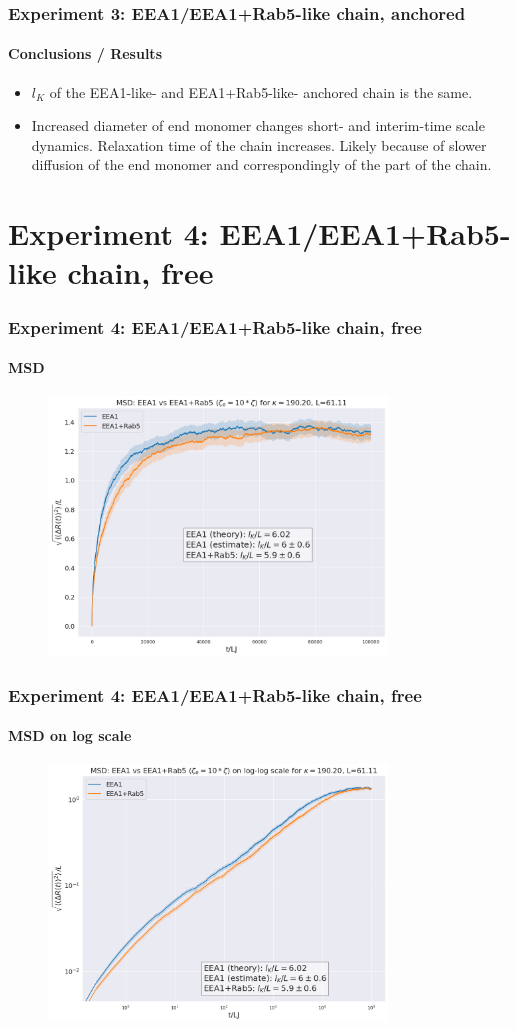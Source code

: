 \documentclass[handout]{beamer}
\begin{document}
\begin{frame}
    \frametitle{Experiment 3: EEA1/EEA1+Rab5-like chain, anchored}
    \framesubtitle{Conclusions / Results}
    \begin{itemize}
        \item $l_K$ of the EEA1-like- and EEA1+Rab5-like- anchored chain is the same.
        \item Increased diameter of end monomer changes short- and interim-time scale 
        dynamics. Relaxation time of the chain increases. Likely because of slower
        diffusion of the end monomer and correspondingly of the part of the chain.
    \end{itemize}
\end{frame}

\section{Experiment 4: EEA1/EEA1+Rab5-like chain, free}

\begin{frame}
    \frametitle{Experiment 4: EEA1/EEA1+Rab5-like chain, free}
    \framesubtitle{MSD}
    \begin{figure}[h]
        \includegraphics[width=9cm]{./17-exp-msd.png}
    \end{figure}
\end{frame}

\begin{frame}
    \frametitle{Experiment 4: EEA1/EEA1+Rab5-like chain, free}
    \framesubtitle{MSD on log scale}
    \begin{figure}[h]
        \includegraphics[width=9cm]{./17-exp-msd-log.png}
    \end{figure}
\end{frame}
\end{document}
